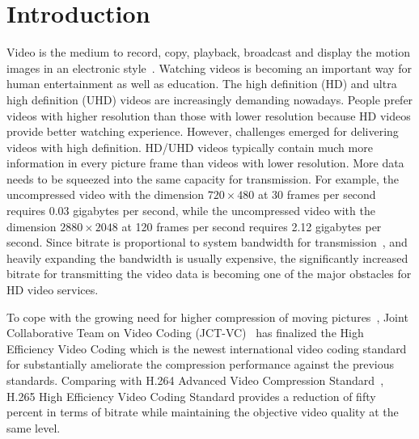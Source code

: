 \chapter{Introduction}\label{ch:chapter1} %

Video is the medium to record, copy, playback, broadcast
and display the motion images in an electronic style~\parencite{RN190}.
Watching videos is becoming an important way for human entertainment as well
as education.
The high definition (HD) and ultra high definition (UHD) videos
are increasingly demanding nowadays.
People prefer videos with higher resolution than those with lower
resolution because HD videos provide better watching experience.
However, challenges emerged for delivering videos with high definition.
HD/UHD videos typically contain much more information in every
picture frame than videos with lower resolution.
More data needs to be squeezed into the same capacity for transmission.
For example, the uncompressed video with the dimension \(720\times480\) at 30 frames
per second requires 0.03 gigabytes per second, while the uncompressed video with
the dimension \(2880\times2048\) at 120 frames per second requires 2.12 gigabytes per
second.
Since bitrate is proportional to system bandwidth for
transmission~\parencite{RN191}, and heavily expanding the
bandwidth is usually expensive, the significantly increased bitrate
for transmitting the video data is becoming one of the
major obstacles for HD video services.

To cope with the growing need for higher compression of moving
pictures~\parencite{RN193}, Joint Collaborative Team on Video
Coding (JCT-VC)~\parencite{RN192} has finalized the High Efficiency Video
Coding which is the newest international video coding standard for
substantially ameliorate the compression performance against the previous
standards.
Comparing with H.264 Advanced Video Compression Standard~\parencite{RN194},
H.265 High Efficiency Video Coding Standard provides a reduction 
of fifty percent in terms of bitrate while maintaining the objective
video quality at the same level.

